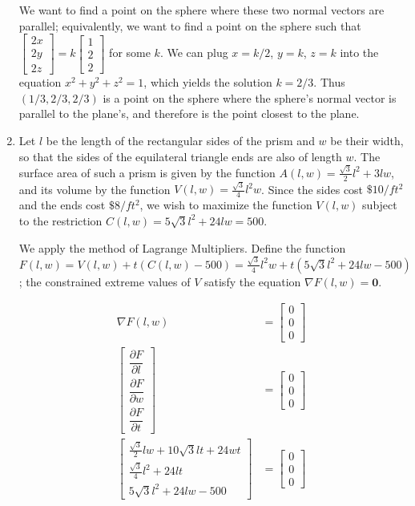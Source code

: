 \documentclass{article}
\begin{document}
\begin{enumerate}
We want to find a point on the sphere where these two normal vectors are
parallel; equivalently, we want to find a point on the sphere such that
$\begin{bmatrix} 2x \\ 2y \\ 2z \end{bmatrix}
 = k\begin{bmatrix} 1 \\ 2 \\ 2 \end{bmatrix}$ for some $k$.  We can plug
$x = k/2$, $y = k$, $z = k$ into the equation $x^2 + y^2 + z^2 = 1$, which
yields the solution $k = 2/3$.  Thus $(1/3, 2/3, 2/3)$ is a point on the
sphere where the sphere's normal vector is parallel to the plane's, and
therefore is the point closest to the plane.

\item

Let $l$ be the length
of the rectangular sides of the prism and $w$ be their width, so that
the sides of the equilateral triangle ends are also of length $w$.
The surface area of such a prism is given by the function $A(l,w) =
\frac{\sqrt{3}}{2}l^2 + 3lw$, and its volume by the function $V(l,w) =
\frac{\sqrt{3}}{4}l^2w$.  Since the sides cost $\$10/ft^2$ and the ends
cost $\$8/ft^2$, we wish to maximize the function $V(l,w)$ subject to
the restriction $C(l,w) = 5\sqrt{3}l^2 + 24lw = 500$.

We apply the method of Lagrange Multipliers.  Define the function
$F(l,w) = V(l,w) + t(C(l,w) - 500) =
\frac{\sqrt{3}}{4}l^2w + t(5\sqrt{3}l^2 + 24lw - 500)$;
the constrained extreme values of $V$ satisfy the equation
$\nabla F(l,w) = \mathbf{0}$.

\begin{align}
 \nabla F(l,w) &= \begin{bmatrix} 0 \\ 0 \\ 0 \end{bmatrix} \nonumber \\
 \begin{bmatrix}
  \dfrac{\partial F}{\partial l} \\
  \dfrac{\partial F}{\partial w} \\
  \dfrac{\partial F}{\partial t}
 \end{bmatrix} &= \begin{bmatrix} 0 \\ 0 \\ 0 \end{bmatrix} \nonumber \\
 \begin{bmatrix}
  \frac{\sqrt{3}}{2}lw + 10\sqrt{3}lt + 24wt \\
  \frac{\sqrt{3}}{4}l^2 + 24lt \\
  5\sqrt{3}l^2 + 24lw - 500
 \end{bmatrix} &= \begin{bmatrix} 0 \\ 0 \\ 0 \end{bmatrix} \label{soln:opt_box}
\end{align}


\end{enumerate}
\end{document}
